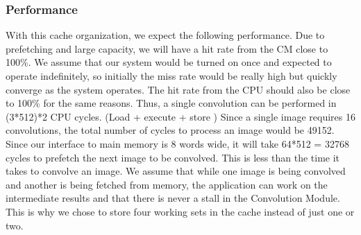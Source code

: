 \subsubsection{Performance}
With this cache organization, we expect the following performance. Due to prefetching and large capacity, we will have a hit rate from the CM close to 100\%. We assume that our system would be turned on once and expected to operate indefinitely, so initially the miss rate would be really high but quickly converge as the system operates. The hit rate from the CPU should also be close to 100\% for the same reasons. Thus, a single convolution can be performed in (3*512)*2 CPU cycles. (Load + execute + store ) Since a single image requires 16 convolutions, the total number of cycles to process an image would be 49152. Since our interface to main memory is 8 words wide, it will take 64*512  = 32768 cycles to prefetch the next image to be convolved. This is less than the time it takes to convolve an image. We assume that while one image is being convolved and another is being fetched from memory, the application can work on the intermediate results and that there is never a stall in the Convolution Module. This is why we chose to store four working sets in the cache instead of just one or two.
